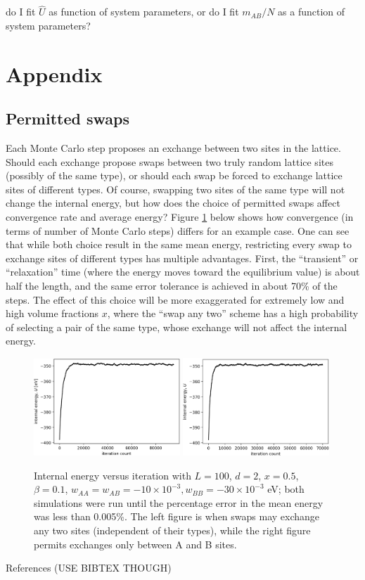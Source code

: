 \documentclass[10pt]{article}
\begin{document}
do I fit $\hat{U}$ as function of system parameters, or do I fit $m_{AB}/N$ as a function of system parameters?

\newpage
\section*{Appendix}
\subsection{Permitted swaps}
Each Monte Carlo step proposes an exchange between two sites in the lattice.
Should each exchange propose swaps between two truly random lattice sites (possibly of the same type), or should each swap be forced to exchange lattice sites of different types.
Of course, swapping two sites of the same type will not change the internal energy, but how does the choice of permitted swaps affect convergence rate and average energy?
Figure \ref{fig:swap} below shows how convergence (in terms of number of Monte Carlo steps) differs for an example case. One can see that while both choice result in the same mean energy, restricting every swap to exchange sites of different types has multiple advantages.
First, the ``transient'' or ``relaxation'' time (where the energy moves toward the equilibrium value) is about half the length, and the same error tolerance is achieved in about 70\% of the steps.
The effect of this choice will be more exaggerated for extremely low and  high volume fractions $x$, where the ``swap any two'' scheme has a high probability of selecting a pair of the same type, whose exchange will not affect the internal energy.

\begin{figure}[h]
\centering
\includegraphics[width=0.49\textwidth]{Figures/swap_any_two_convergence.png}
\includegraphics[width=0.49\textwidth]{Figures/swap_A_B_only_convergence.png}
\caption{Internal energy versus iteration with $L=100$, $d=2$, $x=0.5$, $\beta=0.1$, $w_{AA}=w_{AB}=-10 \times 10^{-3},w_{BB} = -30 \times 10^{-3}$ eV; both simulations were run until the percentage error in the mean energy was less than 0.005\%.
The left figure is when swaps may exchange any two sites (independent of their types), while the right figure permits exchanges only between A and B sites.}
\label{fig:swap}
\end{figure}


\newpage

References (USE BIBTEX THOUGH)
\end{document}
